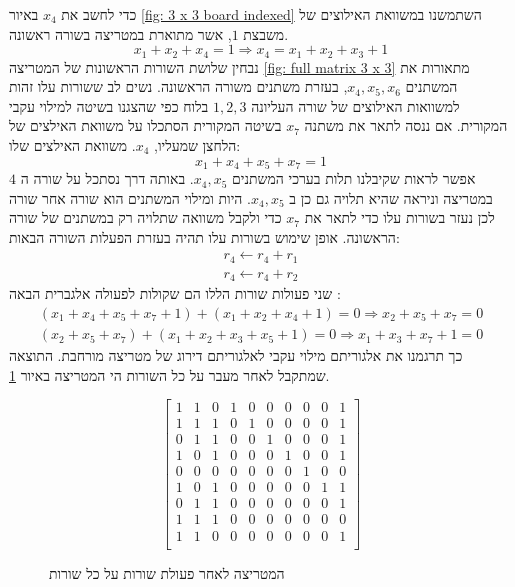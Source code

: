 \documentclass[12pt,leqno]{article}
\theoremstyle{theoremdd}
\begin{document}
כדי לחשב את 
$x_4$
באיור
\ref{fig: 3 x 3 board indexed}
השתמשנו במשוואת האילוצים של 
משבצת 
$1$,
אשר מתוארת במטריצה בשורה ראשונה.
\[
    x_1 + x_2 + x_4 = 1 \Rightarrow x_4 = x_1 + x_2 + x_3 + 1
\]
נבחין שלושת השורות הראשונות  
של המטריצה 
\ref{fig: full matrix 3 x 3}
מתאורות את המשתנים 
$x_4, x_5, x_6$,
בעזרת משתנים 
משורה הראשונה.
נשים לב ששורות עלו זהות למשוואות האילוצים של שורה העליונה 
$1,2,3$
בלוח כפי שהצגנו בשיטה למילוי עקבי המקורית.
אם ננסה לתאר 
את משתנה 
$x_7$
בשיטה המקורית הסתכלו על משוואת האילצים של הלחצן שמעליו,
$x_4$.
משוואת האילצים שלו:
\[ x_1 + x_4 + x_5 + x_7 = 1 \]
אפשר לראות שקיבלנו תלות בערכי המשתנים 
$x_4, x_5$.
באותה דרך 
נסתכל על שורה ה 
$4$
במטריצה 
וניראה שהיא תלויה גם כן ב
$x_4, x_5$.
היות 
ומילוי המשתנים הוא שורה אחר שורה 
לכן 
נעזר בשורות עלו כדי לתאר את 
$x_7$
כדי
ולקבל משוואה שתלויה רק במשתנים של שורה הראשונה.
אופן שימוש בשורות עלו תהיה בעזרת
הפעלות השורה הבאות:
\begin{align*}
    r_4 \leftarrow r_4 + r_1
    \\
    r_4 \leftarrow r_4 + r_2
\end{align*}
שני פעולות שורות הללו הם שקולות לפעולה אלגברית הבאה
:
\begin{align*}
   (x_1 + x_4 + x_5 + x_7 + 1) + (x_1 + x_2 + x_4 + 1) = 0 \Rightarrow x_2 + x_5 + x_7 = 0
    \\
    (x_2 + x_5 + x_7) + (x_1 + x_2 + x_3 + x_5 + 1 ) = 0 \Rightarrow x_1 + x_3 + x_7 + 1 = 0
\end{align*}
כך תרגמנו את אלגוריתם מילוי עקבי לאלגוריתם דירוג של מטריצה מורחבת.
התוצאה שמתקבל לאחר מעבר על כל השורות הי המטריצה 
באיור
\ref{fig: matrix after spanish}.

\begin{figure}[ht]
    \caption{המטריצה לאחר פעולת שורות על כל שורות}
    \label{fig: matrix after spanish}
    \begin{english}
        \begin{center}
            \[
                \left[
                \begin{array}{ccccccccc|c}
                1& 1& 0& 1& 0& 0& 0& 0& 0& 1 \\
                1& 1& 1& 0& 1& 0& 0& 0& 0& 1 \\
                0& 1& 1& 0& 0& 1& 0& 0& 0& 1 \\
                1& 0& 1& 0& 0& 0& 1& 0& 0& 1\\
                0& 0& 0& 0& 0& 0& 0& 1& 0& 0\\
                1& 0& 1& 0& 0& 0& 0& 0& 1& 1\\
                0& 1& 1& 0& 0& 0& 0& 0& 0& 1\\
                1& 1& 1& 0& 0& 0& 0& 0& 0& 0\\
                1& 1& 0& 0& 0& 0& 0& 0& 0& 1\\
            \end{array}
            \right]
            \]
        \end{center}       
    \end{english}
\end{figure}
\end{document}
